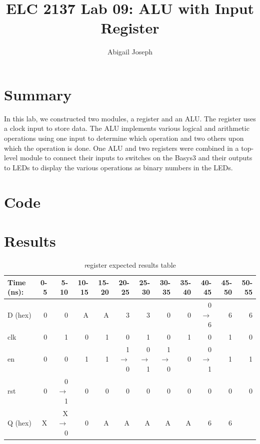 \documentclass[11pt]{article}
\newcommand{\Verilog}[2][]{%
	
}
\begin{document}
\title{ELC 2137 Lab 09: ALU with Input Register}
\author{Abigail Joseph}

\maketitle


\section*{Summary}

In this lab, we constructed two modules, a register and an ALU. The register uses a clock input to store data. The ALU implements various logical and arithmetic operations using one input to determine which operation and two others upon which the operation is done. One ALU and two registers were combined in a top-level module to connect their inputs to switches on the Basys3 and their outputs to LEDs to display the various operations as binary numbers in the LEDs.  


\section*{Code}

\Verilog[firstline=23, caption=Register ,label=code:file_1]{register.sv}
\Verilog[firstline=23, caption=Register Testbench ,label=code:file_2]{register_test.sv}
\Verilog[firstline=23, caption=ALU ,label=code:file_3]{alu.sv}
\Verilog[firstline=23, caption=ALU Testbench ,label=code:file_4]{alu_test.sv}
\Verilog[firstline=23, caption=Top-Level File ,label=code:file_5]{top_lab9.sv}

\section*{Results}


	
\begin{table}[ht]\centering
	\caption{\textit register expected results table}
	\label{ALU:tbl:register_ERT}\medskip
	\begin{tabular}{l|rrrrrrrrrrr}
		Time (ns): & 0-5 & 5-10 & 10-15 & 15-20 & 20-25 & 25-30 & 30-35 & 35-40 & 40-45 & 45-50 & 50-55 \\
		\midrule
		D (hex) & 0 & 0 	  & A & A & 3 	    & 3 	  & 0 	    & 0 & 0$\to$6 & 6 & 6 \\
		clk     & 0 & 1 	  & 0 & 1 & 0 	    & 1 	  & 0 	    & 1 & 0 	  & 1 & 0 \\
		en  	& 0 & 0 	  & 1 & 1 & 1$\to$0 & 0$\to$1 & 1$\to$0 & 0 & 0$\to$1 & 1 & 1 \\
		rst 	& 0 & 0$\to$1 & 0 & 0 & 0 		& 0 	  & 0		& 0 & 0		  & 0 & 0 \\
		\midrule
		Q (hex) & X & X$\to$0 & 0 & A & A & A & A & A & 6 & 6 & \\
		\bottomrule
	\end{tabular}
\end{table}
\end{document}
